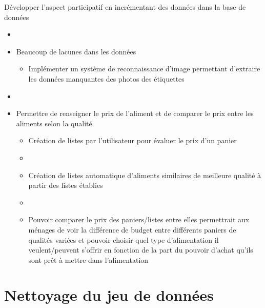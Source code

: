 \begin{frame}{\insertsubsection}
  Développer l'aspect participatif en incrémentant des données dans la base de données
  \begin{itemize}
    \item[]
    \item Beaucoup de lacunes dans les données
          \begin{itemize}
            \item[] Implémenter un système de reconnaissance d'image
              permettant d'extraire les données manquantes des photos des étiquettes
          \end{itemize}
    \item[]
    \item Permettre de renseigner le prix de l'aliment et  de comparer le prix
          entre les aliments selon la qualité
          \begin{itemize}
            \item Création de listes par l'utilisateur pour évaluer le prix d'un panier
            \item[]
            \item Création de listes automatique d'aliments similaires de meilleure qualité à partir des listes établies
            \item[]
            \item Pouvoir comparer le prix des paniers/listes entre elles permettrait aux ménages de voir
                  la différence de budget entre différents paniers de qualités variées
                  et pouvoir choisir quel type d'alimentation il veulent/peuvent s'offrir
                  en fonction de la part du pouvoir d'achat qu'ils sont prêt à mettre dans l'alimentation
          \end{itemize}
  \end{itemize}
\end{frame}

\section{Nettoyage du jeu de données}
